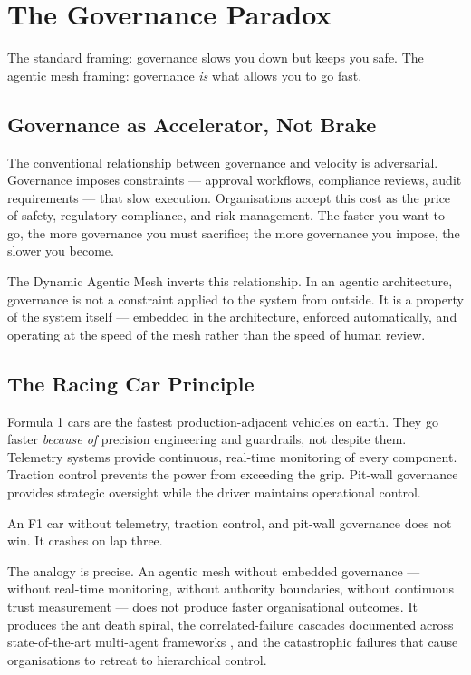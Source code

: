 \chapter{The Governance Paradox}
\label{ch:governance}

\epigraph{The standard framing: governance slows you down but keeps you safe. The agentic mesh framing: governance \emph{is} what allows you to go fast.}{}

\section{Governance as Accelerator, Not Brake}

The conventional relationship between governance and velocity is adversarial. Governance imposes constraints --- approval workflows, compliance reviews, audit requirements --- that slow execution. Organisations accept this cost as the price of safety, regulatory compliance, and risk management. The faster you want to go, the more governance you must sacrifice; the more governance you impose, the slower you become.

The Dynamic Agentic Mesh inverts this relationship. In an agentic architecture, governance is not a constraint applied to the system from outside. It is a property of the system itself --- embedded in the architecture, enforced automatically, and operating at the speed of the mesh rather than the speed of human review.

\section{The Racing Car Principle}

Formula 1 cars are the fastest production-adjacent vehicles on earth. They go faster \emph{because of} precision engineering and guardrails, not despite them. Telemetry systems provide continuous, real-time monitoring of every component. Traction control prevents the power from exceeding the grip. Pit-wall governance provides strategic oversight while the driver maintains operational control.

An F1 car without telemetry, traction control, and pit-wall governance does not win. It crashes on lap three.

The analogy is precise. An agentic mesh without embedded governance --- without real-time monitoring, without authority boundaries, without continuous trust measurement --- does not produce faster organisational outcomes. It produces the ant death spiral, the correlated-failure cascades documented across state-of-the-art multi-agent frameworks \parencite{Cemri2025}, and the catastrophic failures that cause organisations to retreat to hierarchical control.

